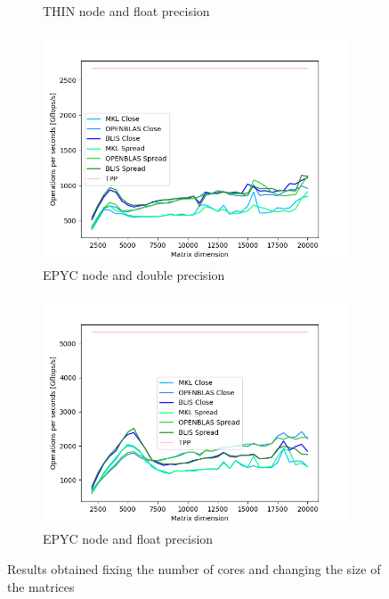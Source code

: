 \documentclass[12pt]{article}
\begin{document}
\begin{figure}[h]
\begin{subfigure}[b]{0.4\textwidth}
                \caption{THIN node and float precision}
                \label{fig:fixed_cores_thin_f}
            \end{subfigure}
            \begin{subfigure}[b]{0.4\textwidth}
                \includegraphics[width = \textwidth]{figs2/fixed_cores_EPYC_d.png}
                \caption{EPYC node and double precision}
                \label{fig:fixed_cores_epyc_d}
            \end{subfigure}
            \begin{subfigure}[b]{0.4\textwidth}
                \includegraphics[width = \textwidth]{figs2/fixed_cores_EPYC_f.png}
                \caption{EPYC node and float precision}
                \label{fig:fixed_cores_epyc_f}
            \end{subfigure}
            \caption{Results obtained fixing the number of cores and changing the size of the matrices}
            \label{fig:fixed_cores}
        \end{figure}
\end{document}
